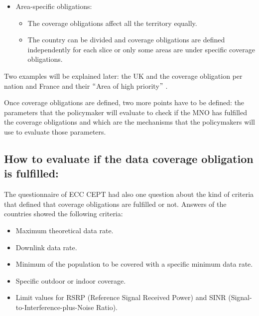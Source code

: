 \begin{itemize}
	\item Area-specific obligations:\par

\begin{itemize}
	\item The coverage obligations affect all the territory equally.\par

	\item The country can be divided and coverage obligations are defined independently for each slice or only some areas are under specific coverage obligations.
\end{itemize}
\end{itemize}

Two examples will be explained later: the UK and the coverage obligation per nation and France and their $``$Area of high priority$"$ .\par

Once coverage obligations are defined, two more points have to be defined: the parameters that the policymaker will evaluate to check if the MNO has fulfilled the coverage obligations and which are the mechanisms that the policymakers will use to evaluate those parameters.\par

\subsection*{How to evaluate if the data coverage obligation is fulfilled:}
The questionnaire of ECC CEPT \cite{2-08} had also one question about the kind of criteria that defined that coverage obligations are fulfilled or not. Answers of the countries showed the following criteria:\par

\begin{itemize}
	\item Maximum theoretical data rate.\par

	\item Downlink data rate.\par

	\item Minimum of the population to be covered with a specific minimum data rate.\par

	\item Specific outdoor or indoor coverage.\par

	\item Limit values for RSRP (Reference Signal Received Power) and SINR (Signal-to-Interference-plus-Noise Ratio).
\end{itemize}\par

